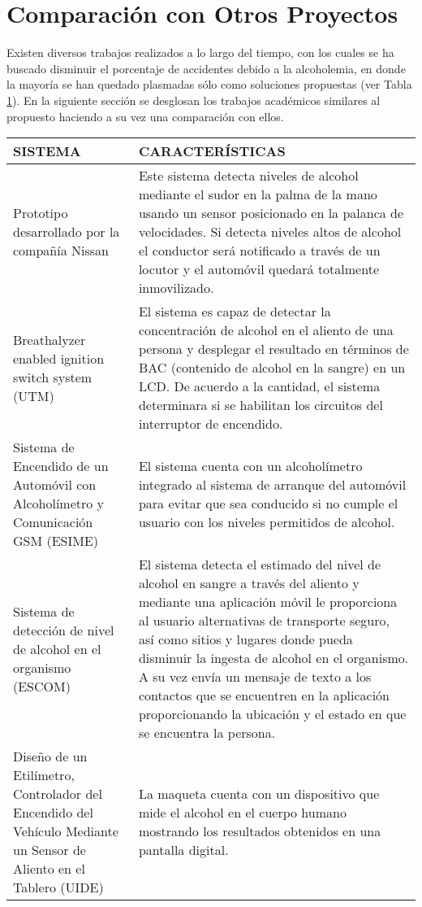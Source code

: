 \section{Comparación con Otros Proyectos}
Existen diversos trabajos realizados a lo largo del tiempo, con los cuales se ha buscado disminuir el porcentaje de accidentes debido a la alcoholemia, en donde la mayoría se han quedado plasmadas sólo como soluciones propuestas (ver Tabla \ref{tab:comparacion}). En la siguiente sección se desglosan los trabajos académicos similares al propuesto haciendo a su vez una comparación con ellos.
\begin{table}[ht]
    \noindent \centering \resizebox{\textwidth}{!}
    {        
        \begin{tabular}{|p{4cm}|p{\textwidth}|}
            \hline
                SISTEMA & CARACTERÍSTICAS \\
            \hline
                Prototipo desarrollado por la compañía Nissan & Este sistema detecta niveles de alcohol mediante el sudor en la palma de la mano usando un sensor posicionado en la palanca de velocidades. Si detecta niveles altos de alcohol el conductor será notificado a través de un locutor y el automóvil quedará totalmente inmovilizado. \cite{drunk_driving_nissan} \\
            \hline
                Breathalyzer enabled ignition switch system (UTM) & El sistema es capaz de detectar la concentración de alcohol en el aliento de una persona y desplegar el resultado en términos de BAC (contenido de alcohol en la sangre) en un LCD. De acuerdo a la cantidad, el sistema determinara si se habilitan los circuitos del interruptor de encendido. \cite{breathalyzer_enabled} \\
            \hline
                Sistema de Encendido de un Automóvil con Alcoholímetro y Comunicación GSM (ESIME) & El sistema cuenta con un alcoholímetro integrado al sistema de arranque del automóvil para evitar que sea conducido si no cumple el usuario con los niveles permitidos de alcohol. \cite{sistema_de_encendido_esime} \\
            \hline
                Sistema de detección de nivel de alcohol en el organismo (ESCOM) & El sistema detecta el estimado del nivel de alcohol en sangre a través del aliento y mediante una aplicación móvil le proporciona al usuario alternativas de transporte seguro, así como sitios y lugares donde pueda disminuir la ingesta de alcohol en el organismo. A su vez envía un mensaje de texto a los contactos que se encuentren en la aplicación proporcionando la ubicación y el estado en que se encuentra la persona. \cite{sistema_de_deteccion_escom} \\
            \hline
                Diseño de un Etilímetro, Controlador del Encendido del Vehículo Mediante un Sensor de Aliento en el Tablero (UIDE) & La maqueta cuenta con un dispositivo que mide el alcohol en el cuerpo humano mostrando los resultados obtenidos en una pantalla digital. \cite{diseno_etilimetro_uide} \\
            \hline
        \end{tabular}
    }
     \label{tab:comparacion}
\end{table}


